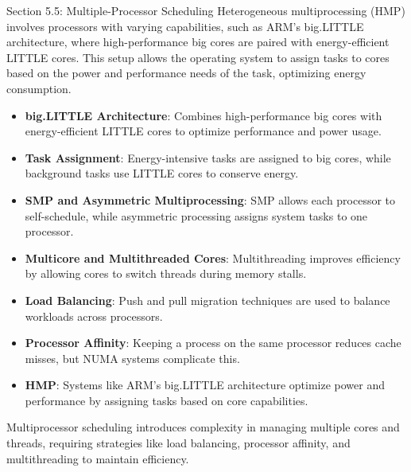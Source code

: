 \begin{notes}{Section 5.5: Multiple-Processor Scheduling}
    Heterogeneous multiprocessing (HMP) involves processors with varying capabilities, such as ARM's big.LITTLE architecture, where high-performance big cores are paired with energy-efficient LITTLE cores. 
    This setup allows the operating system to assign tasks to cores based on the power and performance needs of the task, optimizing energy consumption.
    
    \begin{highlight}
    
        \begin{itemize}
            \item \textbf{big.LITTLE Architecture}: Combines high-performance big cores with energy-efficient LITTLE cores to optimize performance and power usage.
            \item \textbf{Task Assignment}: Energy-intensive tasks are assigned to big cores, while background tasks use LITTLE cores to conserve energy.
        \end{itemize}
    
    \end{highlight}
    
    \begin{highlight}
    
        \begin{itemize}
            \item \textbf{SMP and Asymmetric Multiprocessing}: SMP allows each processor to self-schedule, while asymmetric processing assigns system tasks to one processor.
            \item \textbf{Multicore and Multithreaded Cores}: Multithreading improves efficiency by allowing cores to switch threads during memory stalls.
            \item \textbf{Load Balancing}: Push and pull migration techniques are used to balance workloads across processors.
            \item \textbf{Processor Affinity}: Keeping a process on the same processor reduces cache misses, but NUMA systems complicate this.
            \item \textbf{HMP}: Systems like ARM's big.LITTLE architecture optimize power and performance by assigning tasks based on core capabilities.
        \end{itemize}
    
    Multiprocessor scheduling introduces complexity in managing multiple cores and threads, requiring strategies like load balancing, processor affinity, and multithreading to maintain efficiency.
    
    \end{highlight}
\end{notes}

